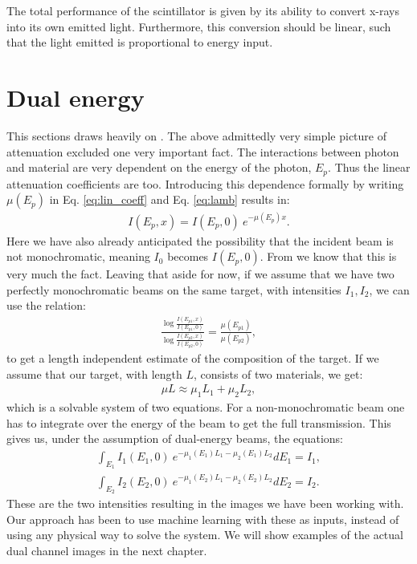 The total performance of the scintillator is given by its ability to convert x-rays into its own emitted light. Furthermore, this conversion should be linear, such that the light emitted is proportional to energy input. 
\section{Dual energy}
\label{sec:dual_energy}
This sections draws heavily on \cite{kochOnlineInspectionXray2017}.
The above admittedly very simple picture of attenuation excluded one very important fact. The interactions between photon and material are very dependent on the energy of the photon, $E_p$. Thus the linear attenuation coefficients are too. Introducing this dependence formally by writing $\mu(E_p)$ in Eq. \eqref{eq:lin_coeff} and Eq. \eqref{eq:lamb} results in:
\begin{align}
	I(E_p, x) = I(E_p,0) \:e^{-\mu(E_p) x}.
\end{align}
Here we have also already anticipated the possibility that the incident beam is not monochromatic, meaning $I_0$ becomes $I(E_p,0)$. From  we know that this is very much the fact. Leaving that aside for now, if we assume that we have two perfectly monochromatic beams on the same target, with intensities $I_1,I_2$, we can use the relation:
\begin{align}
	\frac{\log \frac{I(E_{p1}, x)}{I(E_{p1},0)}}
	{\log \frac{I(E_{p2}, x)}{I(E_{p2},0)}} =\frac{\mu(E_{p1})}{\mu(E_{p2})},
\end{align}
to get a length independent estimate of the composition of the target. If we assume that our target, with length $L$, consists of two materials, we get:
\begin{align}
	\mu L \approx \mu_{1} L_1 +  \mu_{2} L_2,
\end{align}
which is a solvable system of two equations. For a non-monochromatic beam one has to integrate over the energy of the beam to get the full transmission. This gives us, under the assumption of dual-energy beams, the equations:
\begin{align}
	\label{eq:dual_energy}
	\int_{E_1} I_1(E_1,0)  \:e^{-\mu_{1}(E_1) L_1 -  \mu_{2}(E_1) L_2} dE_1 = I_1, \\
	\int_{E_2} I_2(E_2,0)  \:e^{-\mu_{1}(E_2) L_1 -  \mu_{2}(E_2) L_2} dE_2 = I_2.
\end{align}
These are the two intensities resulting in the images we have been working with.  Our approach has been to use machine learning with these as inputs, instead of using any physical way to solve the system. We will show examples of the actual dual channel images in the next chapter.
%
%
